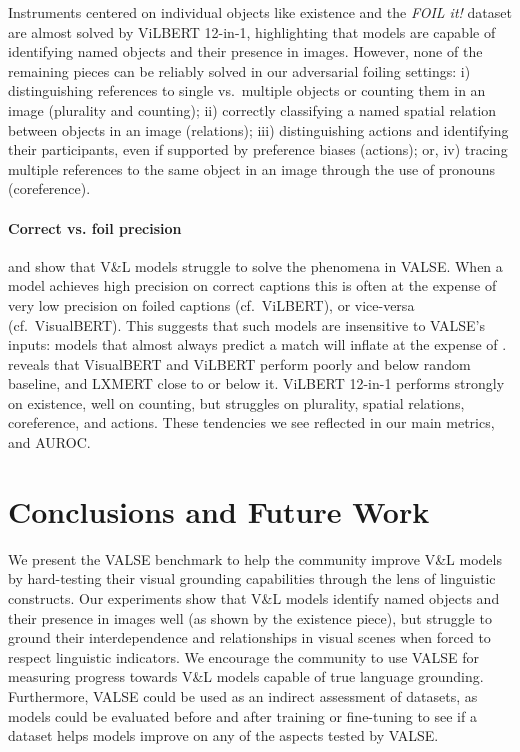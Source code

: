 \documentclass[11pt]{article}
\newcommand{\dataset}{VALSE}
\begin{document}
Instruments centered on individual objects like existence and the \textit{FOIL it!} dataset are almost solved by ViLBERT 12-in-1, highlighting that models are capable of identifying named objects and their presence in images. However, none of the remaining pieces can be reliably solved in our adversarial foiling settings: i) distinguishing references to single vs.\ multiple objects 
or counting them in an image (plurality and counting); ii) correctly classifying a named spatial relation between objects in an image (relations); iii) distinguishing actions and identifying their participants, even if supported by preference biases (actions); or, iv) tracing multiple references to the same object in an image through the use of pronouns (coreference).

\paragraph{Correct vs. foil precision}
 and  show that V\&L models struggle to solve the phenomena in \dataset{}.
When a model achieves high precision on  correct captions  this is often at the expense of very low precision on foiled captions  
(cf.\ ViLBERT), or vice-versa (cf.\ VisualBERT).
This suggests that such models are insensitive to \dataset{}'s inputs:
models that almost always predict a match will inflate  at the expense of .
 reveals that
VisualBERT and ViLBERT perform poorly and below random baseline, and LXMERT 
close to or below it.
ViLBERT 12-in-1 performs strongly on existence, well on counting, but struggles on plurality, spatial relations, coreference, and actions. These tendencies we see reflected in our main metrics,  and AUROC.



\section{Conclusions and Future Work}\label{sec:conclusion}
We present the \dataset{} benchmark to help the community improve V\&L models by hard-testing their visual grounding capabilities through the lens of linguistic constructs.
Our experiments show that V\&L models identify named objects and their presence in images well (as shown by the existence piece), but struggle to ground 
their interdependence and relationships in visual scenes when forced to respect linguistic indicators.
We encourage the community to use \dataset{} for measuring progress towards V\&L models capable of true language grounding.
Furthermore, \dataset{} could be used as an indirect assessment of datasets, as models could be evaluated before and after training or fine-tuning to see if a dataset helps models improve on any of the aspects tested by \dataset{}.
\end{document}

